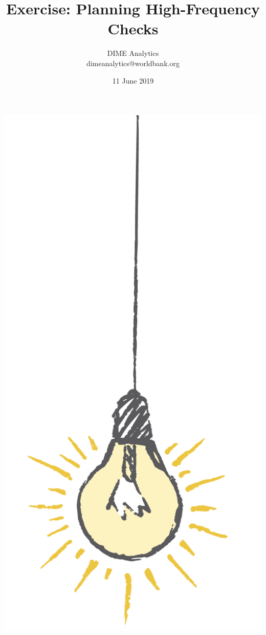 \documentclass{tufte-handout}
\title{Exercise: Planning High-Frequency Checks}
\author{DIME Analytics \\ dimeanalytics@worldbank.org}
\date{11 June 2019}  %
\begin{document}
\maketitle%

\begin{marginfigure}%
  \includegraphics[width=\linewidth]{img/Light bulb-01.png}
\end{marginfigure}
\end{document}
